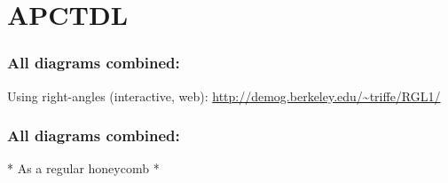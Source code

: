 \documentclass[20pt]{beamer}
\begin{document}
\section{APCTDL}

\begin{frame}
\frametitle{All diagrams combined:}
Using right-angles (interactive, web):
\url{http://demog.berkeley.edu/~triffe/RGL1/}

\end{frame}

\begin{frame}
\frametitle{All diagrams combined:}

* As a regular honeycomb *

\end{frame}

%
%
%
%
\end{document}
